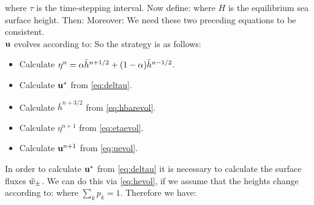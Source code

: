 \documentclass[10pt]{article}
\begin{document}
where $\tau$ is the time-stepping interval. Now define:
where $H$ is the equilibrium sea surface height. Then:
Moreover:
We need these two preceding equations to be consistent. \\
\linebreak
$\mathbf{u}$ evolves according to:
So the strategy is as follows:
\begin{itemize}
	\item Calculate $\eta^{n} = \alpha\bar{h}^{n+1/2} + (1-\alpha)\bar{h}^{n-1/2}$.
	\item Calculate $\mathbf{u}^{*}$ from \cref{eq:deltau}.
	\item Calculate $\bar{h}^{n+3/2}$ from \cref{eq:hbarevol}.  
	\item Calculate $\eta^{n+1}$ from \cref{eq:etaevol}.
	\item Calculate $\mathbf{u}^{n+1}$ from \cref{eq:uevol}.
\end{itemize}
In order to calculate $\mathbf{u}^{*}$ from \cref{eq:deltau} it is necessary to calculate the surface fluxes $\tilde{w}_{\pm}$. We can do this via \cref{eq:hevol}, if we assume that the heights change according to:
where $\sum_{k}p_{k} = 1$. Therefore we have:
\end{document}
